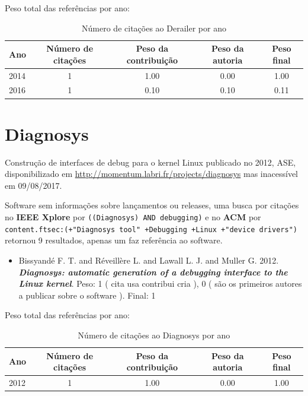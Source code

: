 Peso total das referências por ano:

\begin{table}[h]
\caption{Número de citações ao Derailer por ano}
\centering
\begin{tabular}{| l | c | c | c | c |}
  \hline
  Ano & Número de citações & Peso da contribuição & Peso da autoria & Peso final \\
  \hline
  2014
    & 1
    & 1.00
    & 0.00
    & 1.00 \\
  2016
    & 1
    & 0.10
    & 0.10
    & 0.11 \\
  \hline
\end{tabular}
\end{table}


\section{Diagnosys}

Construção de interfaces de debug para o kernel Linux
publicado no 2012, ASE,
disponibilizado em \url{http://momentum.labri.fr/projects/diagnosys}
mas inacessível em 09/08/2017.

Software sem informações sobre lançamentos ou releases,
uma busca por citações no {\bf IEEE Xplore} por
\texttt{((Diagnosys) AND debugging)}
e no {\bf ACM} por
\texttt{content.ftsec:(+"Diagnosys tool" +Debugging +Linux +"device drivers")}
retornou
9 resultados,
apenas um faz referência ao software.

\begin{itemize}
\item Bissyandé F. T. and Réveillère L. and Lawall L. J. and Muller G.
      2012.
        \textbf{\textit{ Diagnosys: automatic generation of a debugging interface to the Linux kernel}}.
      Peso:
      1 (
          cita
          usa
          contribui
          cria
      ),
      0 (
são os primeiros autores a publicar sobre o software
      ).
      Final:
      1

\end{itemize}

Peso total das referências por ano:

\begin{table}[h]
\caption{Número de citações ao Diagnosys por ano}
\centering
\begin{tabular}{| l | c | c | c | c |}
  \hline
  Ano & Número de citações & Peso da contribuição & Peso da autoria & Peso final \\
  \hline
  2012
    & 1
    & 1.00
    & 0.00
    & 1.00 \\
  \hline
\end{tabular}
\end{table}


